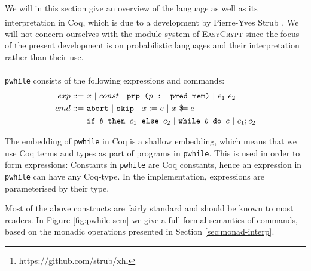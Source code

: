 \documentclass[11pt, leqno, titlepage]{article}
\theoremstyle{definition}
\begin{document}
We will in this section give an overview of the language as well as its
interpretation in Coq, which is due to a development by Pierre-Yves
Strub\footnote{https://github.com/strub/xhl}. We will not concern ourselves with the
module system of \textsc{EasyCrypt} since the focus of the present development is on
probabilistic languages and their interpretation rather than their use.\\
\\
\texttt{pwhile} consists of the following expressions and commands: 
\begin{align*}
  exp ::=~& x ~\vert ~ const ~\vert ~ \texttt{prp ($p$ : pred mem)}~\vert ~ e_1\ e_2\\
  cmd ::=~& \texttt{abort} ~\vert ~ \texttt{skip} ~\vert ~ x := e ~\vert ~ x\ \$\hspace{-0.5em}= e\\
  \vert ~ & \texttt{if } b \texttt{ then } c_1 \texttt{ else } c_2 ~\vert ~
            \texttt{while } b \texttt{ do } c ~\vert ~ c_1 ; c_2
\end{align*}

The embedding of \texttt{pwhile} in Coq is a shallow embedding, which means that we
use Coq terms and types as part of programs in \texttt{pwhile}. This is used in order
to form expressions: Constants in \texttt{pwhile} are Coq constants, hence an
expression in \texttt{pwhile} can have any Coq-type. In the implementation,
expressions are parameterised by their type.

Most of the above constructs are fairly standard and should be known to most
readers. In Figure \ref{fig:pwhile-sem} we give a full formal semantics of commands,
based on the monadic operations presented in Section \ref{sec:monad-interp}.
\end{document}
